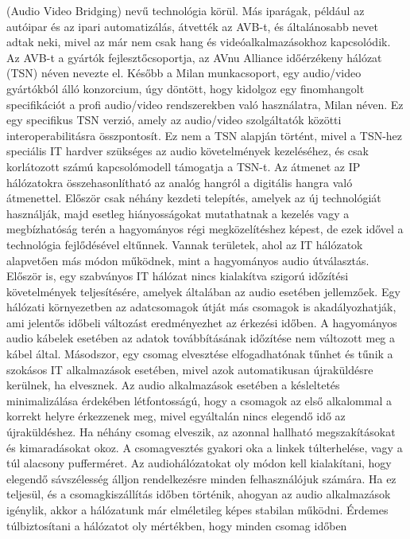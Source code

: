 (Audio Video Bridging) nevű technológia körül.
Más iparágak, például az autóipar és az ipari automatizálás, átvették az AVB-t, és
általánosabb nevet adtak neki, mivel az már nem csak hang és videóalkalmazásokhoz kapcsolódik.
Az AVB-t a gyártók fejlesztőcsoportja, az AVnu Alliance időérzékeny hálózat (TSN) néven nevezte el.
Később a Milan munkacsoport, egy audio/video gyártókból álló konzorcium, úgy
döntött, hogy kidolgoz egy finomhangolt specifikációt a profi audio/video
rendszerekben való használatra, Milan néven. 
Ez egy specifikus TSN verzió, amely az audio/video szolgáltatók közötti interoperabilitásra összpontosít.
Ez nem a TSN alapján történt, mivel a TSN-hez speciális IT hardver szükséges az audio
követelmények kezeléséhez, és csak korlátozott számú kapcsolómodell támogatja a TSN-t. 
Az átmenet az IP hálózatokra összehasonlítható az analóg hangról a digitális
hangra való átmenettel. Először csak néhány kezdeti telepítés, amelyek az új technológiát
használják, majd esetleg hiányosságokat mutathatnak a kezelés vagy a megbízhatóság
terén a hagyományos régi megközelítéshez képest, de ezek idővel a technológia fejlődésével eltűnnek. 
Vannak területek, ahol az IT hálózatok alapvetően más módon működnek, mint a hagyományos audio útválasztás.
Először is, egy szabványos IT hálózat nincs kialakítva szigorú időzítési követelmények
teljesítésére, amelyek általában az audio esetében jellemzőek. 
Egy hálózati környezetben az adatcsomagok útját más csomagok is akadályozhatják, ami jelentős
időbeli változást eredményezhet az érkezési időben.
A hagyományos audio kábelek esetében az adatok továbbításának időzítése nem változott meg a kábel által.
Másodszor, egy csomag elvesztése elfogadhatónak tűnhet és tűnik a szokásos IT
alkalmazások esetében, mivel azok automatikusan újraküldésre kerülnek, ha elvesznek.
Az audio alkalmazások esetében a késleltetés minimalizálása érdekében
létfontosságú, hogy a csomagok az első alkalommal a korrekt helyre érkezzenek meg, mivel egyáltalán nincs
elegendő idő az újraküldéshez. Ha néhány csomag elveszik, az azonnal hallható megszakításokat és kimaradásokat okoz.
A csomagvesztés gyakori oka a linkek túlterhelése, vagy a túl alacsony pufferméret.
Az audiohálózatokat oly módon kell kialakítani, hogy elegendő sávszélesség álljon rendelkezésre
minden felhasználójuk számára. Ha ez teljesül, és a csomagkiszállítás időben történik, ahogyan az audio alkalmazások igénylik,
akkor a hálózatunk már elméletileg képes stabilan működni.
Érdemes túlbiztosítani a hálózatot oly mértékben, hogy minden csomag időben
